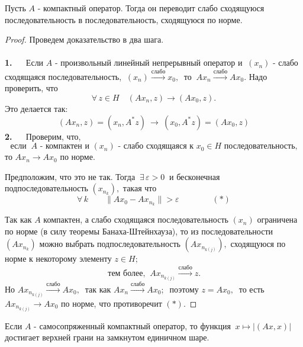 \documentclass[a4paper]{article}
\begin{document}
\begin{prop}
Пусть $A$ - компактный оператор. Тогда он переводит слабо
сходящуюся последовательность в последовательность, сходящуюся по
норме.
\end{prop}
\begin{proof}
Проведем доказательство в два шага.\\
\\
\textbf{1.} $\quad$ Если $A$ - произвольный линейный непрерывный
оператор и $\ (x_n)$ - слабо сходящаяся последовательность, $\
(x_n) \stackrel{\mbox{слабо}}{\longrightarrow} x_0, \ $ то $\ Ax_n
\stackrel{\mbox{слабо}}{\longrightarrow} Ax_0.$  Надо проверить,
что
$$
\forall \, z\in H \quad (Ax_n, z) \rightarrow (Ax_0, z).
$$
Это делается так:
$$
(Ax_n, z) = (x_n, A^{*}z)\  \rightarrow\  (x_0, A^{*}z) = (Ax_0,
z)
$$
\textbf{2.} $\quad$ Проверим, что,
$$
\mbox{если }\  A  \mbox{ - компактен и $(x_n)$ - слабо сходящаяся
к $x_0 \in H$ последовательность,}
$$
то $Ax_n \rightarrow Ax_0 \mbox{ по норме}.$
\bigskip

Предположим, что это не так. Тогда $\ \exists \, \varepsilon > 0\
$ и бесконечная подпоследовательность $(x_{n_k}),$ такая что
$$
\forall \, k \qquad \|Ax_0 - Ax_{n_k}\| > \varepsilon \qquad\qquad
(*)
$$

Так как $A$ компактен, а слабо сходящаяся последовательность
$(x_n)$ ограничена по норме (в силу теоремы Банаха-Штейнхауза), то
из последовательности $(Ax_{n_k})$ можно выбрать
подпоследовательность $(Ax_{n_{k(j)}}),$ сходящуюся по норме к
некоторому элементу $z\in H; \ $
$$\mbox{ тем более, }\  Ax_{n_{k(j)}}
\stackrel{\mbox{слабо}}{\longrightarrow} z.\
$$
Но $Ax_{n_{k(j)}} \stackrel{\mbox{слабо}}{\longrightarrow} Ax_0,\
$ так как $Ax_n \stackrel{\mbox{слабо}}{\longrightarrow} Ax_0;\ $
поэтому $z = Ax_0,\ $ то есть $Ax_{n_{k(j)}} \longrightarrow Ax_0$
по норме, что противоречит $(*).$

\end{proof}
\begin{stm}
Если $A$ - самосопряженный компактный оператор, то функция $\ x
\mapsto |(Ax, x)|\ $ достигает верхней грани на замкнутом
единичном шаре.
\end{stm}
\end{document}
